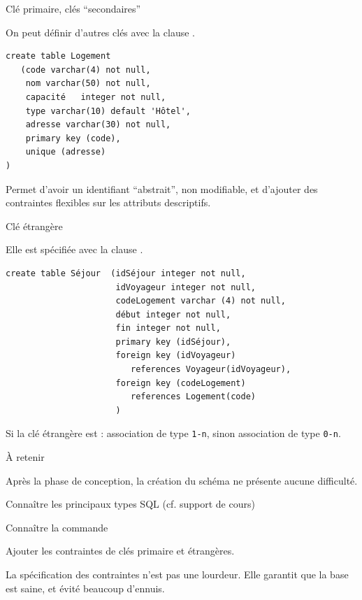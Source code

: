 \begin{frame}[fragile]{Clé primaire, clés ``secondaires''}

On peut définir d'autres clés avec la clause .

\vfill

\begin{verbatim}
create table Logement 
   (code varchar(4) not null,
    nom varchar(50) not null,
    capacité   integer not null,
    type varchar(10) default 'Hôtel',
    adresse varchar(30) not null,
    primary key (code),
    unique (adresse)
)
\end{verbatim}

\vfill

Permet d'avoir un identifiant ``abstrait'', non modifiable, et d'ajouter des
contraintes flexibles sur les attributs descriptifs.

\end{frame}


\begin{frame}[fragile]{Clé étrangère}

Elle est spécifiée avec la clause  .

\vfill
\begin{verbatim}
create table Séjour  (idSéjour integer not null,
                      idVoyageur integer not null,
                      codeLogement varchar (4) not null,
                      début integer not null,
                      fin integer not null,
                      primary key (idSéjour),
                      foreign key (idVoyageur) 
                         references Voyageur(idVoyageur),
                      foreign key (codeLogement) 
                         references Logement(code)
                      )
\end{verbatim}

\vfill

Si la clé étrangère est : association de type \texttt{1-n},
sinon association de type \texttt{0-n}.

\end{frame}

\begin{frame}{À retenir}

Après la phase de conception, la création du schéma ne présente aucune difficulté.
\vfill

\begin{redbullet}
   \item  Connaître les principaux types SQL (cf. support de cours)
   \item Connaître la commande 
   \item Ajouter les contraintes de clés primaire et étrangères.
\end{redbullet}

\vfill

La spécification des contraintes n'est pas une lourdeur. Elle garantit que la base est saine,
et évité beaucoup d'ennuis.
\end{frame}


